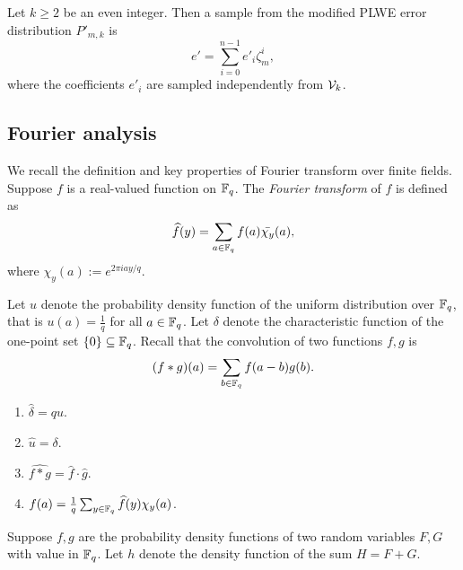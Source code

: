 \documentclass{amsart}
\begin{document}
\begin{Definition}
\label{def: modified distribution}
Let $k \geq 2$ be an even integer. Then a sample from the modified PLWE error distribution $P'_{m,k}$ is
\[
    e' = \sum_{i=0}^{n-1} e'_i \zeta_m^{i},
\]
where the coefficients $e'_i$ are sampled independently from $\mathcal{V}_k$.
\end{Definition}




\subsection{Fourier analysis}
We recall the definition and key properties of Fourier transform over finite fields.
Suppose $f$ is a real-valued function on $\mathbb{F}_q$. The {\it Fourier transform} of $f$ is defined as
\[
    \widehat{f}(y) = \sum_{a \in \mathbb{F}_q} f(a) \bar{\chi_y}(a),
\]
where $\chi_y(a) := e^{2 \pi i ay/q}$.

Let $u$ denote the probability density function of the uniform distribution over $\mathbb{F}_q$, that is $u(a) = \frac{1}{q}$ for all $a \in \mathbb{F}_q$. Let $\delta$ denote the characteristic function of the
one-point set $\{0\} \subseteq \mathbb{F}_q$. Recall that the convolution of two functions $f,g$ is
\[
    (f  \ast g ) (a) = \sum_{b \in \mathbb{F}_q} f(a-b)g(b).
\]
\begin{Fact} \label{fact: basicfourier}\qquad
\begin{enumerate}
\item $\widehat{\delta} = qu$.

\item  $\widehat{u} = \delta$.

\item $\widehat{f \ast g} = \widehat{f} \cdot \widehat{g}$.


\item $f(a) = \frac{1}{q} \sum_{y \in \mathbb{F}_q} \widehat{f}(y)\chi_y(a)$.

\end{enumerate}
\end{Fact}

Suppose $f,g$ are the probability density functions of two random variables $F,G$ with value in $\mathbb{F}_q$. Let $h$ denote the density function of the sum $H =F+G$.
\end{document}
